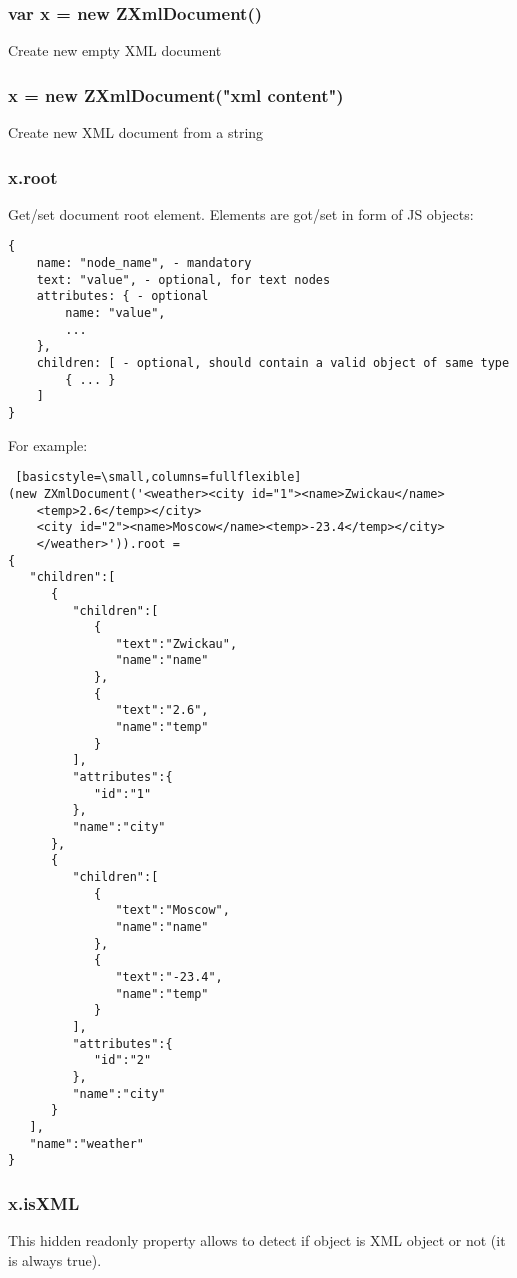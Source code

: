 \subsubsection{var x = new ZXmlDocument()}
Create new empty XML document

\subsubsection{x = new ZXmlDocument("xml content")}
Create new XML document from a string

\subsubsection{x.root}
Get/set document root element. Elements are got/set in form of JS objects:

\begin{lstlisting}[basicstyle=\small,columns=fullflexible]
{
    name: "node_name", - mandatory
    text: "value", - optional, for text nodes
    attributes: { - optional
    	name: "value",
    	...
    },
    children: [ - optional, should contain a valid object of same type
    	{ ... }
    ]
}
\end{lstlisting}

For example:
\begin{lstlisting} [basicstyle=\small,columns=fullflexible]
(new ZXmlDocument('<weather><city id="1"><name>Zwickau</name>
	<temp>2.6</temp></city> 
	<city id="2"><name>Moscow</name><temp>-23.4</temp></city>
	</weather>')).root =
{  
   "children":[  
      {  
         "children":[  
            {  
               "text":"Zwickau",
               "name":"name"
            },
            {  
               "text":"2.6",
               "name":"temp"
            }
         ],
         "attributes":{  
            "id":"1"
         },
         "name":"city"
      },
      {  
         "children":[  
            {  
               "text":"Moscow",
               "name":"name"
            },
            {  
               "text":"-23.4",
               "name":"temp"
            }
         ],
         "attributes":{  
            "id":"2"
         },
         "name":"city"
      }
   ],
   "name":"weather"
}
\end{lstlisting}

\subsubsection{x.isXML}
This hidden readonly property allows to detect if object is XML object or not (it is always true).

